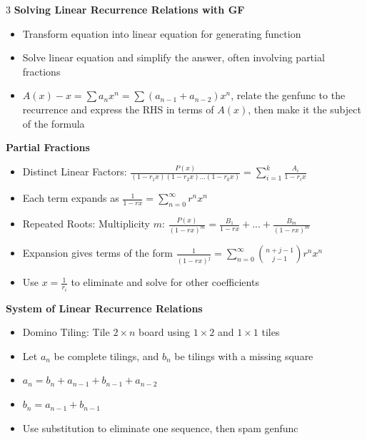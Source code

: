 \documentclass[10pt, landscape]{article}
\begin{document}
\begin{multicols*}{3}
\textbf{Solving Linear Recurrence Relations with GF}
\begin{itemize}
    \item Transform equation into linear equation for generating function
    \item Solve linear equation and simplify the answer, often involving partial fractions
    \item $A(x)-x=\sum a_nx^n=\sum(a_{n-1}+a_{n-2})x^n$, relate the genfunc to the recurrence and express the RHS in terms of $A(x)$, then make it the subject of the formula
\end{itemize}

\textbf{Partial Fractions}
\begin{itemize}
    \item Distinct Linear Factors: $\frac{P(x)}{(1-r_1x)(1-r_2x)...(1-r_kx)}=\sum_{i=1}^k\frac{A_i}{1-r_ix}$
    \item Each term expands as $\frac{1}{1-rx}=\sum_{n=0}^\infty r^n x^n$
    \item Repeated Roots: Multiplicity $m$: $\frac{P(x)}{(1-rx)^m}=\frac{B_1}{1-rx}+...+\frac{B_m}{(1-rx)^m}$
    \item Expansion gives terms of the form $\frac{1}{(1-rx)^j}=\sum_{n=0}^\infty{n+j-1 \choose j-1} r^nx^n$
    \item Use $x=\frac{1}{r_i}$ to eliminate and solve for other coefficients
\end{itemize}

\textbf{System of Linear Recurrence Relations}
\begin{itemize}
    \item Domino Tiling: Tile $2 \times n$ board using $1 \times 2$ and $1 \times 1$ tiles
    \item Let $a_n$ be complete tilings, and $b_n$ be tilings with a missing square
    \item $a_n=b_n+a_{n-1}+b_{n-1}+a_{n-2}$
    \item $b_n=a_{n-1}+b_{n-1}$
    \item Use substitution to eliminate one sequence, then spam genfunc
\end{itemize}


\end{multicols*}
\end{document}
